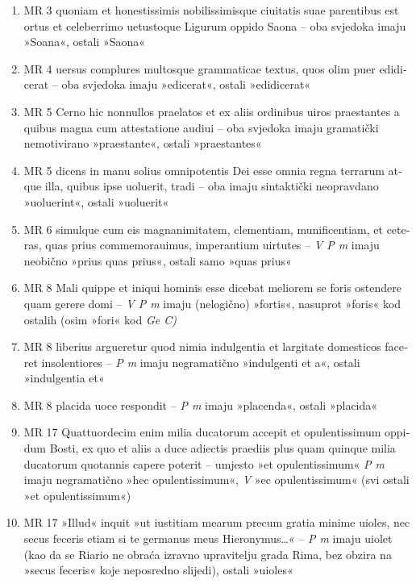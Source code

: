 \documentclass[a5paper,twoside]{article}
\begin{document}
\begin{enumerate}[label=\alph*)]
\item MR 3 \textlatin{quoniam et honestissimis nobilissimisque ciuitatis suae parentibus est ortus et celeberrimo uetustoque Ligurum oppido Saona} – oba svjedoka imaju »Soana«, ostali »Saona«
\item MR 4 \textlatin{uersus complures multosque grammaticae textus, quos olim puer edidicerat} – oba svjedoka imaju »edicerat«, ostali »edidicerat«
\item MR 5 \textlatin{Cerno hic nonnullos praelatos et ex aliis ordinibus uiros praestantes a quibus magna cum attestatione audiui} – oba svjedoka imaju gramatički nemotivirano »praestante«, ostali »praestantes«
\item MR 5 \textlatin{dicens in manu solius omnipotentis Dei esse omnia regna terrarum atque illa, quibus ipse uoluerit, tradi} – oba imaju sintaktički neopravdano »uoluerint«, ostali »uoluerit«
\item MR 6 \textlatin{simulque cum eis magnanimitatem, clementiam, munificentiam, et ceteras, quas prius commemorauimus, imperantium uirtutes} – \textit{V P m} imaju neobično »prius quas prius«, ostali samo »quas prius«
\item MR 8 \textlatin{Mali quippe et iniqui hominis esse dicebat meliorem se foris ostendere quam gerere domi} – \textit{V P m} imaju (nelogično) »fortis«, nasuprot »foris« kod ostalih (osim »fori« kod \textit{Ge C)}
\item MR 8 \textlatin{liberius argueretur quod nimia indulgentia et largitate domesticos faceret insolentiores} – \textit{P m} imaju negramatično »indulgenti et a«, ostali »indulgentia et«
\item MR 8 \textlatin{placida uoce respondit} – \textit{P m} imaju »placenda«, ostali »placida«
\item MR 17 \textlatin{Quattuordecim enim milia ducatorum accepit et opulentissimum oppidum Bosti, ex quo et aliis a duce adiectis praediis plus quam quinque milia ducatorum quotannis capere poterit} – umjesto »et opulentissimum« \textit{P m} imaju negramatično »hec opulentissimum«, \textit{V} »ec opulentissimum« (svi ostali »et opulentissimum«)
\item MR 17 \textlatin{»Illud« inquit »ut iustitiam mearum precum gratia minime uioles, nec secus feceris etiam si te germanus meus Hieronymus\dots«} – \textit{P m} imaju uiolet (kao da se Riario ne obraća izravno upravitelju grada Rima, bez obzira na »secus feceris« koje neposredno slijedi), ostali »uioles«

\end{enumerate}
\end{document}
